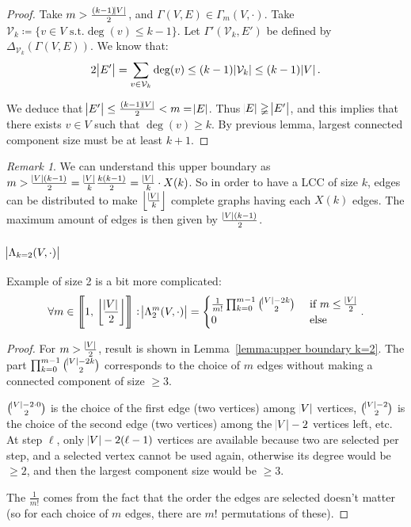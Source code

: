 \documentclass{article}
\theoremstyle{definition}
\theoremstyle{remark}
\newtheorem*{remark}{Remark}
\newcommand{\intint}[2]{\left\llbracket#1, \, #2\right\rrbracket}
\newcommand{\floor}[1]{\left\lfloor#1\right\rfloor}
\newcommand{\st}{\text{ s.t.}}
\begin{document}
			\begin{proof} Take $m > \frac {(k-1)\abs V}2$, and $\Gamma(V, E) \in \Gamma_m(V, \cdot)$. Take $\mathcal V_k \coloneqq \{v \in V \st \deg(v) \leq k-1\}$.
			Let $\Gamma'(\mathcal V_k, E')$ be defined by $\Delta_{\mathcal V_k}(\Gamma(V, E))$. We know that:
			\[2\abs {E'} = \sum_{v \in \mathcal V_k}\deg(v) \leq (k-1)\abs {\mathcal V_k} \leq (k-1)\abs V.\]

			We deduce that $\abs {E'} \leq \frac {(k-1)\abs V}2 < m = \abs E$. Thus $\abs E \gneqq \abs {E'}$, and this implies that there exists $v \in V$ such that $\deg(v) \geq k$.
			By previous lemma, largest connected component size must be at least $k+1$.
			\end{proof}

			\begin{remark} We can understand this upper boundary as $m > \frac {\abs V(k-1)}2 = \frac {\abs V}k\frac {k(k-1)}2 = \frac {\abs V}k \cdot X(k)$. So in
			order to have a LCC of size $k$, edges can be distributed to make $\floor {\frac {\abs V}k}$ complete graphs having each $X(k)$ edges.
			The maximum amount of edges is then given by $\frac {\abs V(k-1)}2$.
			\end{remark}

		\subsubsection{$\abs {\Lambda_{k=2}(V, \cdot)}$}
			Example of size 2 is a bit more complicated:
			\[\forall m \in \intint 1{\floor {\frac {\abs V}2}} : \abs {\Lambda_2^m(V, \cdot)} = \begin{cases}
				\frac 1{m!}\prod_{k=0}^{m-1}\binom {\abs V-2k}2 &\text{ if } m \leq \frac {\abs V}2 \\
				0 &\text{ else}
			\end{cases}.\]

			\begin{proof} For $m > \frac {\abs V}2$, result is shown in Lemma~\ref{lemma:upper boundary k=2}. The part $\prod_{k=0}^{m-1}\binom {\abs V-2k}2$ corresponds
			to the choice of $m$ edges without making a connected component of size $\geq 3$.

			$\binom {\abs V-2 \cdot 0}2$ is the choice of the first edge (two vertices) among $\abs V$ vertices, $\binom {\abs V-2}2$ is the choice of the second edge
			(two vertices) among the $\abs V-2$ vertices left, etc. At step $\ell$, only $\abs V-2(\ell-1)$ vertices are available because two are selected per step, and
			a selected vertex cannot be used again, otherwise its degree would be $\geq 2$, and then the largest component size would be $\geq 3$.

			The $\frac 1{m!}$ comes from the fact that the order the edges are selected doesn't matter (so for each choice of $m$ edges, there are $m!$ permutations
			of these).
			\end{proof}
\end{document}
